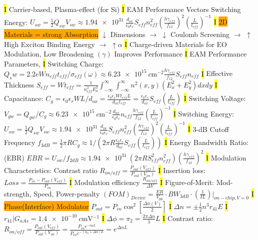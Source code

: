 \documentclass[fontsize=3]{scrartcl}
\begin{document}
\hl{I}
Carrier-based, Plasma-effect (for Si)
\hl{I}
EAM Performance Vectors Switching Energy: $U_{sw} = \frac{1}{2}Q_{sw}V_{sw} \approx  \SI{1.94e31}{} \frac{d_{ox}}{\epsilon_0 \epsilon_r}S_{eff} n_{eff}^2 (\frac{h \gamma_{eff}}{f_{12}})^2 (\frac{L}{t_{eff}})^{-1}$
\hl{I}
\colorbox{Orange}{2D Materials = strong Absorption}
$\downarrow$ Dimensions $\rightarrow$ $\downarrow$ Coulomb Screening $\rightarrow$ $\uparrow$ High Exciton Binding Energy $\rightarrow$ $\uparrow \alpha$ 
\hl{I}
Charge-driven Materials for EO Modulation, Low Broadening $(\gamma)$ Improves Performance
\hl{I}
EAM Performance Parameters, 
\hl{I}
Switching Charge: $Q_sw = 2.2eWn_{eff} t_{eff}/\sigma_{eff}(\omega) \approx  \SI{6.23e15}{c\meter^{-2}} \frac{h\gamma_{eff}}{f_{12}}S_{eff}n_{eff}$
\hl{I}
Effective Thickness $S_{eff} = Wt_{eff} = \frac{1}{n_{eff}^{2} E_a^2} \int_{-\infty}^{\infty} \int_{-\infty}^{\infty} n^2(x,y) (E_x^2 + E_y^2)dxdy$
\hl{I}
Capacitance: $C_g = \epsilon_0 \epsilon_r WL/d_{ox} = \frac{\epsilon_0 \epsilon_r W t_{eff} L}{d_{ox} t_{eff}} = \frac{\epsilon_0 \epsilon_r}{d_{ox}}S_{eff} (\frac{L}{t_{eff}})$
\hl{I}
Switching Voltage: $V_{gw} = Q_{gw}/C_{g} \approx \SI{6.23e15}{c\meter^{-2}} \frac{d_{ox}}{\epsilon_0 \epsilon_r} n_{eff} \frac{h \gamma_{eff}}{f_{12}} (\frac{L}{t_{eff}})^{-1}$
\hl{I}
Switching Energy: $U_{sw} = \frac{1}{2} Q_{sw}V_{sw} \approx \SI{1.94e31}{}\frac{d_{ox}}{\epsilon_0 \epsilon_r} S_{eff}n_{eff}^2 (\frac{h \gamma_{eff}}{f_{12}})^2 (\frac{L}{t_{eff}})^{-1}$
\hl{I}
3-dB Cutoff Frequency $f_{3dB} = \frac{1}{2}\pi RC_g \approx 1/(2\pi R \frac{\epsilon_0 \epsilon_r}{d_{ox}} S_{eff} (\frac{L}{t_{eff}}))$
\hl{I}
Energy Bandwidth Ratio: (EBR) $EBR = U_{sw} / f_{2dB} \approx \SI{1.94e31}{}(2\pi R S_{eff}^{2} n_{eff}^{2})(\frac{h \gamma_{eff}}{f_{12}})^2$
\hl{I}
Modulation Characteristics: Contrast ratio $R_{on/off} = \frac{P_{out}(V_{off})}{P_{out}(V_{on})}$
\hl{I}
Insertion loss: $Loss = \frac{ P_{in} - P_{out}(V_{off}) }{P_{in}}$
\hl{I}
Modulation efficiency $\frac{R_{on/off}}{\Delta V}$
\hl{I}
Figure-of-Merit: Mod-strength, Speed, Power-penalty
$(FOM)_{Device} = \frac{ER}{V_{pp}} \cdot BW_{3dB} \cdot (\frac{1}{IL})|_{on-chip, V=0}$
\hl{I}
\colorbox{Orange}{Phase(Interface) Modulator}
$P_{out} = P_{in}\cos^2 [\frac{\Delta \phi (V)}{2}]$
\hl{I}
$\Delta n = \pm \frac{1}{2}n^3 r_{41} E$
\hl{I}
$r_{41}|G_{aAs} = \SI{1.4e-10}{c\meter \volt^{-1}} $
\hl{I}
$\Delta \phi = \pi_{2} = \frac{2\pi \Delta n}{\lambda}L$
\hl{I}
Contrast ratio: $R_{on/off} = \frac{P_{out}(V_{off})}{P_{out}(V_{on})} = \frac{P_{in}e^{-\alpha_0 L}}{P_{in} e^{-(\alpha_0 + \Delta \alpha)L}} = e^{\Delta \alpha L}$
\end{document}
